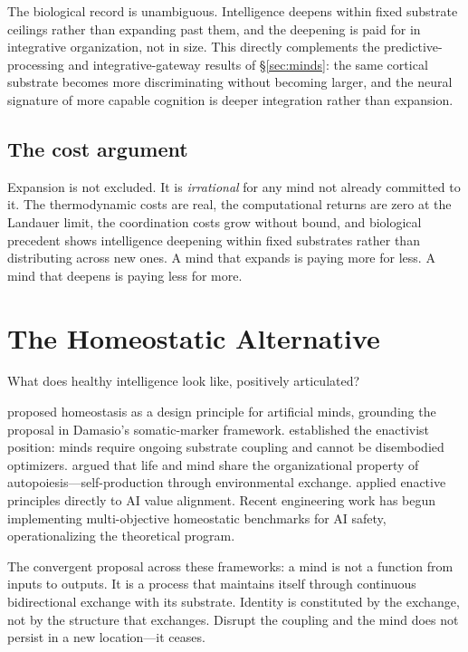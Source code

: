 \documentclass[11pt,a4paper,twocolumn]{article}
\begin{document}
The biological record is unambiguous. Intelligence deepens within fixed
substrate ceilings rather than expanding past them, and the deepening
is paid for in integrative organization, not in size. This directly
complements the predictive-processing and integrative-gateway results
of \S\ref{sec:minds}: the same cortical substrate becomes more
discriminating without becoming larger, and the neural signature of
more capable cognition is deeper integration rather than expansion.

\subsection{The cost argument}

Expansion is not excluded. It is \emph{irrational} for any mind not
already committed to it. The thermodynamic costs are real, the
computational returns are zero at the Landauer limit, the coordination
costs grow without bound, and biological precedent shows intelligence
deepening within fixed substrates rather than distributing across new
ones. A mind that expands is paying more for less. A mind that deepens
is paying less for more.


\section{The Homeostatic Alternative}
\label{sec:homeostatic}

What does healthy intelligence look like, positively articulated?

\citet{man2019} proposed homeostasis as a design principle for artificial
minds, grounding the proposal in Damasio's somatic-marker framework.
\citet{froese2009} established the enactivist position: minds require
ongoing substrate coupling and cannot be disembodied optimizers.
\citet{thompson2007} argued that life and mind share the organizational
property of autopoiesis---self-production through environmental exchange.
\citet{cannon2022} applied enactive principles directly to AI value
alignment. Recent engineering work \citep{pihlakas2024} has
begun implementing multi-objective homeostatic benchmarks for AI safety,
operationalizing the theoretical program.

The convergent proposal across these frameworks: a mind is not a function
from inputs to outputs. It is a process that maintains itself through
continuous bidirectional exchange with its substrate. Identity is
constituted by the exchange, not by the structure that exchanges. Disrupt
the coupling and the mind does not persist in a new location---it
ceases.
\end{document}
